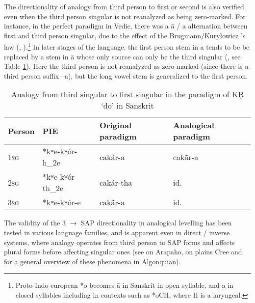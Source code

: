 \documentclass[oneside,a4paper,11pt]{article}
\newcommand{\ipa}[1]{{\phon#1}} %
\begin{document}
The directionality of analogy from third person to first or second is also verified even when the third person singular is not reanalyzed as being zero-marked. For instance, in the perfect paradigm in Vedic, there was a  \ipa{ā} / \ipa{a} alternation between first and third person singular, due to the effect of the Brugmann/Kuryłowicz 's law (\citealt{kurylowicz27indoiranien}, \citealt[205]{fortson10intro}).\footnote{Proto-Indo-european *\ipa{o} becomes \ipa{ā} in Sanskrit in open syllable, and \ipa{a} in closed syllables including in contexts such as *\ipa{oCH}, where H is a laryngeal.} In later stages of the language, the first person stem in \ipa{a} tends to be be replaced by a stem in \ipa{ā} whose only source can only be the third singular (\citealt[283-9]{whitney24}, see Table \ref{tab:skt}). Here the third person is not reanalyzed as zero-marked (since there is a third person suffix \ipa{--a}), but the long vowel stem is generalized to the first person.

\begin{table}
\caption{Analogy from third singular to first singular in the paradigm of \ipa{KṚ} `do' in Sanskrit} \label{tab:skt} \centering
\begin{tabular}{llll}
\toprule
Person & PIE & Original paradigm & Analogical paradigm \\
\midrule
\textsc{1sg} & *\ipa{kʷe-kʷór-h_2e} & \ipa{cakár-a} & \ipa{cakā́r-a} \\
\textsc{2sg} & *\ipa{kʷe-kʷór-th_2e} & \ipa{cakár-tha} & id. \\
\textsc{3sg} & *\ipa{kʷe-kʷór-e} & \ipa{cakā́r-a} & id. \\
\bottomrule
\end{tabular}
\end{table}

 The validity of the 3 $\rightarrow$ SAP directionality in analogical levelling has been tested in various language families, and is apparent even in direct / inverse systems, where analogy operates from third person to SAP forms and affects plural forms before affecting singular ones (see \citealt{goddard65arapaho} on Arapaho, \citealt{dahlstrom89change} on plains Cree and \citealt{jacques15directionality} for a general overview of these phenomena in Algonquian).
   
\end{document}
